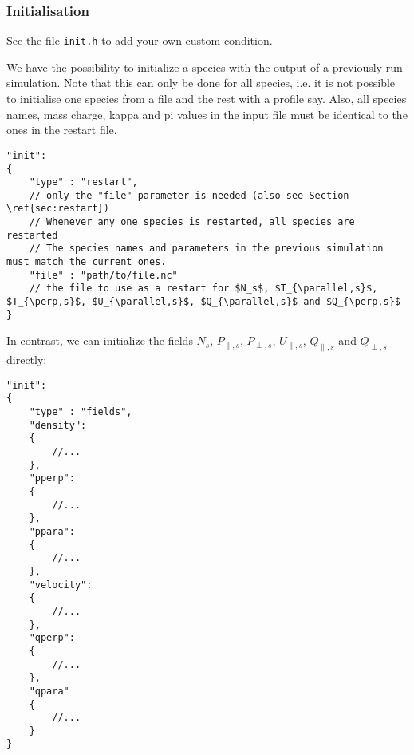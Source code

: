 \subsubsection{Initialisation} \label{sec:init}

See the file {\tt init.h} to add your own custom condition.

We have the possibility to
initialize a species with the output of a previously
run simulation. Note that this can only be done for all species, i.e. it is not possible
to initialise one species from a file and the rest with a profile say.
Also, all species names, mass charge, kappa and pi values in the input file must be identical to the ones in the restart file.
\begin{verbatim}
"init":
{
    "type" : "restart",
    // only the "file" parameter is needed (also see Section \ref{sec:restart})
    // Whenever any one species is restarted, all species are restarted
    // The species names and parameters in the previous simulation must match the current ones.
    "file" : "path/to/file.nc"
    // the file to use as a restart for $N_s$, $T_{\parallel,s}$, $T_{\perp,s}$, $U_{\parallel,s}$, $Q_{\parallel,s}$ and $Q_{\perp,s}$
}
\end{verbatim}

In contrast, we can initialize the fields $N_s$, $P_{\parallel,s}$, $P_{\perp,s}$, $U_{\parallel,s}$, $Q_{\parallel,s}$ and $Q_{\perp,s}$
directly:
\begin{verbatim}
"init":
{
    "type" : "fields",
    "density":
    {
        //...
    },
    "pperp":
    {
        //...
    },
    "ppara":
    {
        //...
    },
    "velocity":
    {
        //...
    },
    "qperp":
    {
        //...
    },
    "qpara"
    {
        //...
    }
}
\end{verbatim}

